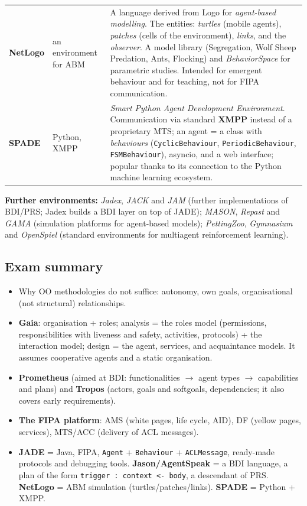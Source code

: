 \documentclass[11pt,a4paper]{article}
\theoremstyle{definition}
\begin{document}
\begin{center}
\begin{tabular}{p{} p{} p{}}
\textbf{NetLogo}
  & an environment for ABM
  & A language derived from Logo for \emph{agent-based modelling}. The entities: \emph{turtles} (mobile
    agents), \emph{patches} (cells of the environment), \emph{links}, and the \emph{observer}. A model
    library (Segregation, Wolf Sheep Predation, Ants, Flocking) and \emph{BehaviorSpace} for parametric
    studies. Intended for emergent behaviour and for teaching, not for FIPA communication. \\
\textbf{SPADE}
  & Python, XMPP
  & \emph{Smart Python Agent Development Environment}. Communication via standard
    \textbf{XMPP} instead of a proprietary MTS; an agent = a class with \emph{behaviours}
    (\texttt{CyclicBehaviour}, \texttt{PeriodicBehaviour}, \texttt{FSMBehaviour}), asyncio, and a
    web interface; popular thanks to its connection to the Python machine learning ecosystem. \\
\bottomrule
\end{tabular}
\end{center}

\textbf{Further environments:} \emph{Jadex}, \emph{JACK} and \emph{JAM} (further implementations
of BDI/PRS; Jadex builds a BDI layer on top of JADE); \emph{MASON}, \emph{Repast} and
\emph{GAMA} (simulation platforms for agent-based models); \emph{PettingZoo}, \emph{Gymnasium}
and \emph{OpenSpiel} (standard environments for multiagent reinforcement learning).

\subsection{Exam summary}

\begin{itemize}
\item Why OO methodologies do not suffice: autonomy, own goals, organisational (not structural)
  relationships.
\item \textbf{Gaia}: organisation + roles; analysis = the roles model (permissions,
  responsibilities with liveness and safety, activities, protocols) + the interaction model;
  design = the agent, services, and acquaintance models. It assumes cooperative agents and a
  static organisation.
\item \textbf{Prometheus} (aimed at BDI: functionalities $\to$ agent types $\to$ capabilities
  and plans) and \textbf{Tropos} (actors, goals and softgoals, dependencies; it also covers
  early requirements).
\item \textbf{The FIPA platform}: AMS (white pages, life cycle, AID), DF (yellow pages,
  services), MTS/ACC (delivery of ACL messages).
\item \textbf{JADE} = Java, FIPA, \texttt{Agent} + \texttt{Behaviour} + \texttt{ACLMessage},
  ready-made protocols and debugging tools. \textbf{Jason/AgentSpeak} = a BDI language, a plan
  of the form \texttt{trigger : context <- body}, a descendant of PRS. \textbf{NetLogo} = ABM
  simulation (turtles/patches/links). \textbf{SPADE} = Python + XMPP.
\end{itemize}
\end{document}
